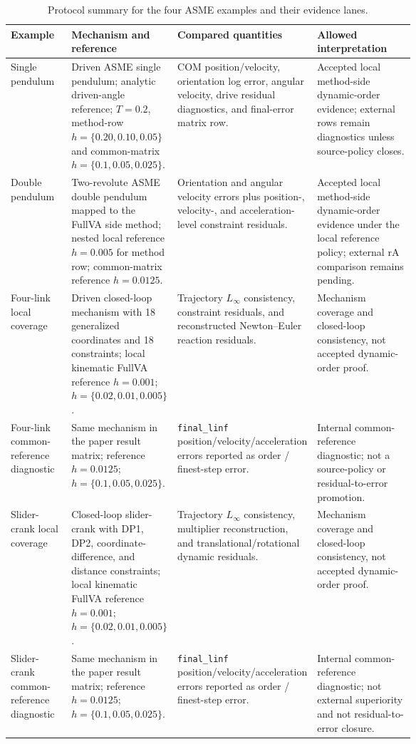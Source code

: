 \documentclass[10pt]{article}
\begin{document}
\begin{table}[H]
\centering
\caption{Protocol summary for the four ASME examples and their evidence lanes.}
\label{tab:asme_protocols}
\small
\begin{tabularx}{\linewidth}{p{0.15\linewidth}p{0.26\linewidth}p{0.25\linewidth}Y}
\toprule
\textbf{Example} & \textbf{Mechanism and reference} & \textbf{Compared quantities} & \textbf{Allowed interpretation} \\
\midrule
Single pendulum & Driven ASME single pendulum; analytic driven-angle reference; $T=0.2$, method-row $h=\{0.20,0.10,0.05\}$ and common-matrix $h=\{0.1,0.05,0.025\}$. & COM position/velocity, orientation log error, angular velocity, drive residual diagnostics, and final-error matrix row. & Accepted local method-side dynamic-order evidence; external rows remain diagnostics unless source-policy closes. \\
Double pendulum & Two-revolute ASME double pendulum mapped to the FullVA side method; nested local reference $h=0.005$ for method row; common-matrix reference $h=0.0125$. & Orientation and angular velocity errors plus position-, velocity-, and acceleration-level constraint residuals. & Accepted local method-side dynamic-order evidence under the local reference policy; external rA comparison remains pending. \\
Four-link local coverage & Driven closed-loop mechanism with 18 generalized coordinates and 18 constraints; local kinematic FullVA reference $h=0.001$; $h=\{0.02,0.01,0.005\}$. & Trajectory $L_\infty$ consistency, constraint residuals, and reconstructed Newton--Euler reaction residuals. & Mechanism coverage and closed-loop consistency, not accepted dynamic-order proof. \\
Four-link common-reference diagnostic & Same mechanism in the paper result matrix; reference $h=0.0125$; $h=\{0.1,0.05,0.025\}$. & \texttt{final\_linf} position/velocity/acceleration errors reported as order / finest-step error. & Internal common-reference diagnostic; not a source-policy or residual-to-error promotion. \\
Slider-crank local coverage & Closed-loop slider-crank with DP1, DP2, coordinate-difference, and distance constraints; local kinematic FullVA reference $h=0.001$; $h=\{0.02,0.01,0.005\}$. & Trajectory $L_\infty$ consistency, multiplier reconstruction, and translational/rotational dynamic residuals. & Mechanism coverage and closed-loop consistency, not accepted dynamic-order proof. \\
Slider-crank common-reference diagnostic & Same mechanism in the paper result matrix; reference $h=0.0125$; $h=\{0.1,0.05,0.025\}$. & \texttt{final\_linf} position/velocity/acceleration errors reported as order / finest-step error. & Internal common-reference diagnostic; not external superiority and not residual-to-error closure. \\
\bottomrule
\end{tabularx}
\end{table}
\end{document}
